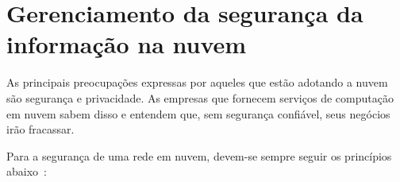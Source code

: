 \section{Gerenciamento da segurança da informação na nuvem}

As principais preocupações expressas por aqueles que estão adotando a nuvem são
segurança e privacidade. As empresas que fornecem serviços de computação em nuvem
sabem disso e entendem que, sem segurança confiável, seus negócios irão
fracassar.

Para a segurança de uma rede em nuvem, devem-se sempre seguir os princípios
abaixo~\cite{gartner-what-to-evaluate}:


\newcommand{\itemm}[1]{\item\textbf{#1}}

